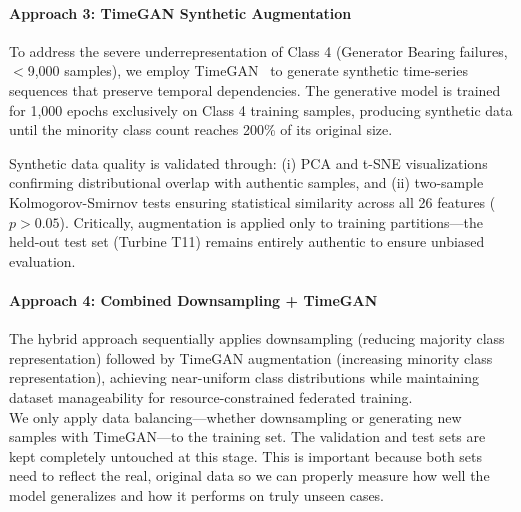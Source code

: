 \documentclass[12pt]{article}
\begin{document}
\paragraph{Approach 3: TimeGAN Synthetic Augmentation}
To address the severe underrepresentation of Class 4 (Generator Bearing failures, $<$9,000 samples), we employ TimeGAN~\cite{yoon_time_series_gan_2019} to generate synthetic time-series sequences that preserve temporal dependencies. The generative model is trained for 1,000 epochs exclusively on Class 4 training samples, producing synthetic data until the minority class count reaches 200\% of its original size. 

Synthetic data quality is validated through: (i) PCA and t-SNE visualizations confirming distributional overlap with authentic samples, and (ii) two-sample Kolmogorov-Smirnov tests ensuring statistical similarity across all 26 features ($p > 0.05$). Critically, augmentation is applied only to training partitions—the held-out test set (Turbine T11) remains entirely authentic to ensure unbiased evaluation.

\paragraph{Approach 4: Combined Downsampling + TimeGAN}
The hybrid approach sequentially applies downsampling (reducing majority class representation) followed by TimeGAN augmentation (increasing minority class representation), achieving near-uniform class distributions while maintaining dataset manageability for resource-constrained federated training.\\

We only apply data balancing—whether downsampling or generating new samples with TimeGAN—to the training set. The validation and test sets are kept completely untouched at this stage. This is important because both sets need to reflect the real, original data so we can properly measure how well the model generalizes and how it performs on truly unseen cases.
\end{document}
